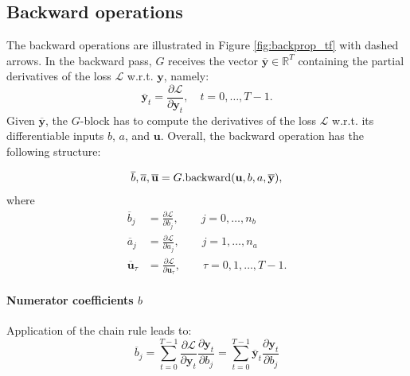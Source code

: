 \documentclass{article}
\newcommand{\ac}{a} %
\newcommand{\bb}{b} %
\newcommand{\sens}[1]{\tilde{#1}}
\newcommand{\adjoint}[1]{\overline{#1}}
\newcommand{\tvec}[1]{\mathbf{#1}}
\newcommand{\nsamp}{T}
\newcommand{\pdiff}[2]{\frac{\partial #1}{\partial #2}}
\newcommand{\loss}{\mathcal{L}}
\begin{document}
\subsection{Backward operations} 
The backward operations are illustrated in Figure \ref{fig:backprop_tf} with dashed arrows. 
In the {backward pass}, $G$ receives the vector $\adjoint{\tvec{y}} \in \mathbb{R}^{\nsamp}$ containing the partial derivatives of the loss $\loss$ w.r.t. $\tvec{y}$, namely:
\begin{equation}
\adjoint{\tvec{y}}_t = \pdiff{\loss}{\tvec{y}_t},\quad  t=0,\dots,\nsamp-1. 
\end{equation}
Given $\adjoint{\tvec{y}}$, the $G$-block has to compute the derivatives of the loss $\loss$ w.r.t. its differentiable inputs  $\bb$, $\ac$, and $\tvec{u}$. Overall, the backward operation has the following structure:

\begin{equation}
\adjoint{\bb}, \adjoint{\ac}, \adjoint{\tvec{u}} = G.{\rm backward}(\tvec{u}, \bb, \ac, \adjoint{\tvec{y}}),
\end{equation}
where 
\begin{subequations}
	\begin{align} 
	\adjoint{\bb}_j &= \pdiff{\loss}{\bb_j},\qquad j=0,\dots,n_\bb \\
	\adjoint{\ac}_j &= \pdiff{\loss}{\ac_j},\qquad j=1,\dots,n_\ac\\
	\adjoint{\tvec{u}}_\tau &= \pdiff{\loss}{\tvec{u}_\tau},\qquad \tau=0,1,\dots,\nsamp\!-\!1. \label{eq:adjsensu}
	\end{align}
\end{subequations}

\paragraph{Numerator coefficients $\bb$} 
Application of the chain rule leads to:
\begin{equation*}
\adjoint{\bb}_j = \sum_{t=0}^{\nsamp-1} \pdiff{\loss}{\tvec{y}_t} \pdiff{\tvec{y}_t}{\bb_j} = \sum_{t=0}^{\nsamp-1} \adjoint{\tvec{y}}_t \pdiff{\tvec{y}_t}{b_j}
\end{equation*}
\end{document}
